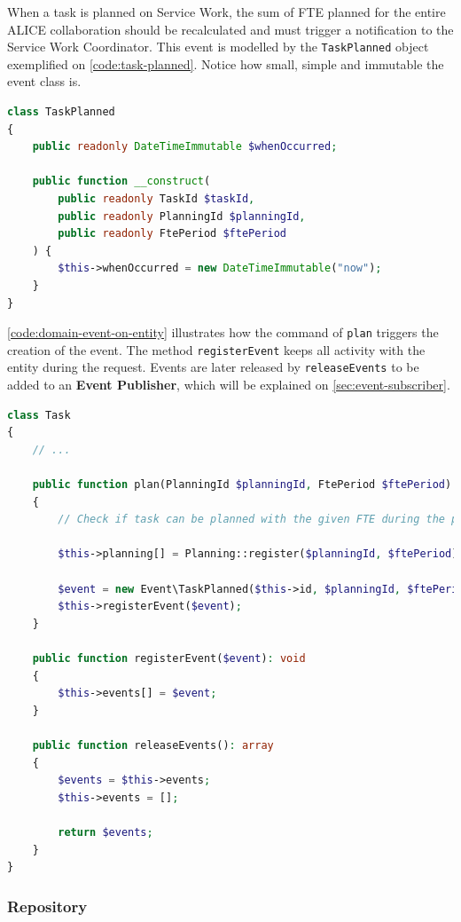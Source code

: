When a task is planned on Service Work, the sum of FTE planned for the entire ALICE collaboration should be recalculated and must trigger a notification to the Service Work Coordinator. This event is modelled by the \texttt{TaskPlanned} object exemplified on \autoref{code:task-planned}. Notice how small, simple and immutable the event class is.

\begin{lstlisting}[language=PHP,label={code:task-planned},caption={Event to model the domain concept of ``a task was planned''.}]
class TaskPlanned
{
	public readonly DateTimeImmutable $whenOccurred;

	public function __construct(
		public readonly TaskId $taskId,
		public readonly PlanningId $planningId,
		public readonly FtePeriod $ftePeriod
	) {
		$this->whenOccurred = new DateTimeImmutable("now");
	}
}
\end{lstlisting}

\autoref{code:domain-event-on-entity} illustrates how the command of \texttt{plan} triggers the creation of the event. The method \texttt{registerEvent} keeps all activity with the entity during the request. Events are later released by \texttt{releaseEvents} to be added to an \textbf{Event Publisher}, which will be explained on \autoref{sec:event-subscriber}.

\begin{lstlisting}[language=PHP,label={code:domain-event-on-entity},caption={Example of the \texttt{Task} entity coordinating the \texttt{TaskPlanned} event.}]
class Task
{
    // ...

    public function plan(PlanningId $planningId, FtePeriod $ftePeriod): void
    {
	    // Check if task can be planned with the given FTE during the period...

		$this->planning[] = Planning::register($planningId, $ftePeriod);

		$event = new Event\TaskPlanned($this->id, $planningId, $ftePeriod);
		$this->registerEvent($event);
    }

	public function registerEvent($event): void
	{
		$this->events[] = $event;
	}

	public function releaseEvents(): array
	{
		$events = $this->events;
		$this->events = [];

		return $events;
	}
}
\end{lstlisting}

\subsubsection{Repository}
\label{sec:repository-interface}

